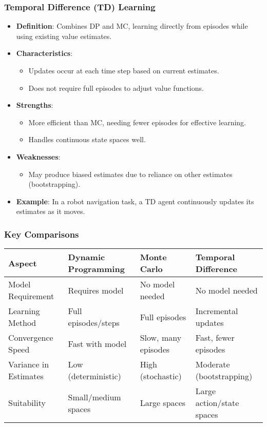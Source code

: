 \documentclass[aspectratio=169]{beamer}
\begin{document}
\begin{frame}[fragile]
    \frametitle{Temporal Difference (TD) Learning}
    \begin{itemize}
        \item \textbf{Definition}: Combines DP and MC, learning directly from episodes while using existing value estimates.
        \item \textbf{Characteristics}:
        \begin{itemize}
            \item Updates occur at each time step based on current estimates.
            \item Does not require full episodes to adjust value functions.
        \end{itemize}
        \item \textbf{Strengths}:
        \begin{itemize}
            \item More efficient than MC, needing fewer episodes for effective learning.
            \item Handles continuous state spaces well.
        \end{itemize}
        \item \textbf{Weaknesses}:
        \begin{itemize}
            \item May produce biased estimates due to reliance on other estimates (bootstrapping).
        \end{itemize}
        \item \textbf{Example}: In a robot navigation task, a TD agent continuously updates its estimates as it moves.
    \end{itemize}
\end{frame}

\begin{frame}[fragile]
    \frametitle{Key Comparisons}
    \begin{table}[ht]
        \centering
        \begin{tabular}{|l|l|l|l|}
            \hline
            \textbf{Aspect} & \textbf{Dynamic Programming} & \textbf{Monte Carlo} & \textbf{Temporal Difference} \\ \hline
            Model Requirement & Requires model & No model needed & No model needed \\ \hline
            Learning Method & Full episodes/steps & Full episodes & Incremental updates \\ \hline
            Convergence Speed & Fast with model & Slow, many episodes & Fast, fewer episodes \\ \hline
            Variance in Estimates & Low (deterministic) & High (stochastic) & Moderate (bootstrapping) \\ \hline
            Suitability & Small/medium spaces & Large spaces & Large action/state spaces \\ \hline
        \end{tabular}
    \end{table}
\end{frame}
\end{document}
